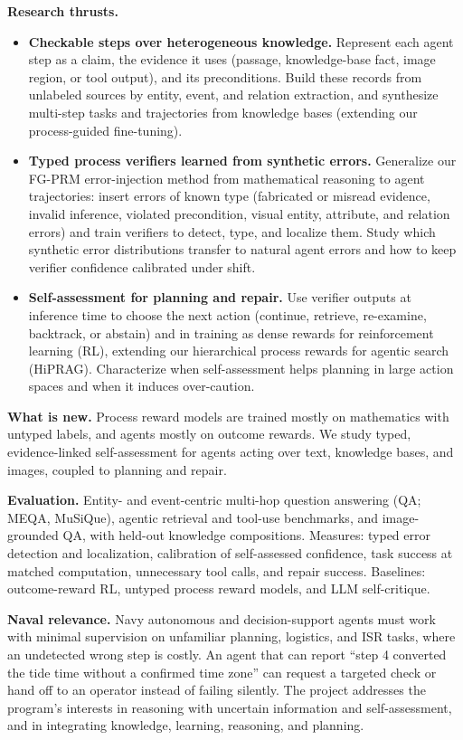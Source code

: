 \documentclass[11pt]{article}
\newcommand{\head}[1]{{\color{navy}\textbf{#1}}\enspace}
\begin{document}
\head{Research thrusts.}
\begin{itemize}
\item \textbf{Checkable steps over heterogeneous knowledge.} Represent each agent step as a claim, the evidence it uses (passage, knowledge-base fact, image region, or tool output), and its preconditions. Build these records from unlabeled sources by entity, event, and relation extraction, and synthesize multi-step tasks and trajectories from knowledge bases (extending our process-guided fine-tuning).
\item \textbf{Typed process verifiers learned from synthetic errors.} Generalize our FG-PRM error-injection method from mathematical reasoning to agent trajectories: insert errors of known type (fabricated or misread evidence, invalid inference, violated precondition, visual entity, attribute, and relation errors) and train verifiers to detect, type, and localize them. Study which synthetic error distributions transfer to natural agent errors and how to keep verifier confidence calibrated under shift.
\item \textbf{Self-assessment for planning and repair.} Use verifier outputs at inference time to choose the next action (continue, retrieve, re-examine, backtrack, or abstain) and in training as dense rewards for reinforcement learning (RL), extending our hierarchical process rewards for agentic search (HiPRAG). Characterize when self-assessment helps planning in large action spaces and when it induces over-caution.
\end{itemize}

\head{What is new.} Process reward models are trained mostly on mathematics with untyped labels, and agents mostly on outcome rewards. We study typed, evidence-linked self-assessment for agents acting over text, knowledge bases, and images, coupled to planning and repair.

\head{Evaluation.} Entity- and event-centric multi-hop question answering (QA; MEQA, MuSiQue), agentic retrieval and tool-use benchmarks, and image-grounded QA, with held-out knowledge compositions. Measures: typed error detection and localization, calibration of self-assessed confidence, task success at matched computation, unnecessary tool calls, and repair success. Baselines: outcome-reward RL, untyped process reward models, and LLM self-critique.

\head{Naval relevance.} Navy autonomous and decision-support agents must work with minimal supervision on unfamiliar planning, logistics, and ISR tasks, where an undetected wrong step is costly. An agent that can report ``step 4 converted the tide time without a confirmed time zone'' can request a targeted check or hand off to an operator instead of failing silently. The project addresses the program's interests in reasoning with uncertain information and self-assessment, and in integrating knowledge, learning, reasoning, and planning.
\end{document}
